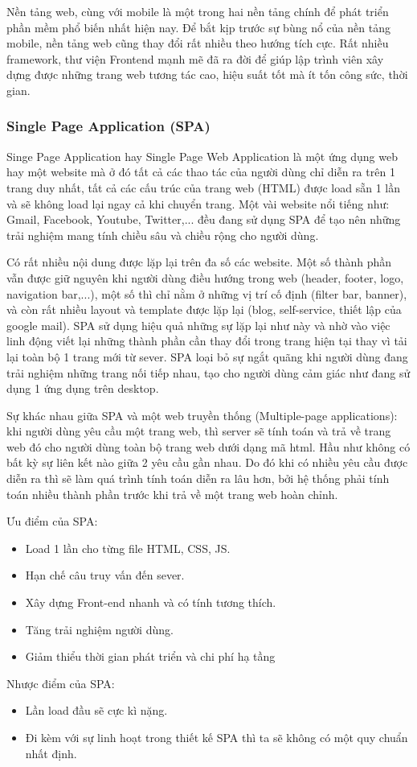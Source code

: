 Nền tảng web, cùng với mobile là một trong hai nền tảng chính để phát triển phần mềm phổ biến nhất hiện nay. Để bắt kịp trước sự bùng nổ của nền tảng mobile, nền tảng web cũng thay đổi rất nhiều theo hướng tích cực. Rất nhiều framework, thư viện Frontend mạnh mẽ đã ra đời để giúp lập trình viên xây dựng được những trang web tương tác cao, hiệu suất tốt mà ít tốn công sức, thời gian.
\subsubsection{Single Page Application (SPA)}
Singe Page Application hay Single Page Web Application là một ứng dụng web hay một website mà ở đó tất cả các thao tác của người dùng chỉ diễn ra trên 1 trang duy nhất, tất cả các cấu trúc của trang web (HTML) được load sẵn 1 lần và sẽ không load lại ngay cả khi chuyển trang. Một vài website nổi tiếng như: Gmail, Facebook, Youtube, Twitter,... đều đang sử dụng SPA để tạo nên những trải nghiệm mang tính chiều sâu và chiều rộng cho người dùng.\par
Có rất nhiều nội dung được lặp lại trên đa số các website. Một số thành phần vẫn được giữ nguyên khi người dùng điều hướng trong web (header, footer, logo, navigation bar,...), một số thì chỉ nằm ở những vị trí cố định (filter bar, banner), và còn rất nhiều layout và template được lặp lại (blog, self-service, thiết lập của google mail). SPA sử dụng hiệu quả những sự lặp lại như này và nhờ vào việc linh động viết lại những thành phần cần thay đổi trong trang hiện tại thay vì tải lại toàn bộ 1 trang mới từ sever. SPA loại bỏ sự ngắt quãng khi người dùng đang trải nghiệm những trang nối tiếp nhau, tạo cho người dùng cảm giác như đang sử dụng 1 ứng dụng trên desktop.\par
Sự khác nhau giữa SPA và một web truyền thống (Multiple-page applications): khi người dùng yêu cầu một trang web, thì server sẽ tính toán và trả về trang web đó cho người dùng toàn bộ trang web dưới dạng mã html. Hầu như không có bất kỳ sự liên kết nào giữa 2 yêu cầu gần nhau. Do đó khi có nhiều yêu cầu được diễn ra thì sẽ làm quá trình tính toán diễn ra lâu hơn, bởi hệ thống phải tính toán nhiều thành phần trước khi trả về một trang web hoàn chỉnh. \par
Ưu điểm của SPA:
\begin{itemize}
    \item Load 1 lần cho từng file HTML, CSS, JS.
    \item Hạn chế câu truy vấn đến sever.
    \item Xây dựng Front-end nhanh và có tính tương thích.
    \item Tăng trải nghiệm người dùng.
    \item Giảm thiểu thời gian phát triển và chi phí hạ tầng
\end{itemize}
Nhược điểm của SPA:
\begin{itemize}
    \item Lần load đầu sẽ cực kì nặng.
    \item Đi kèm với sự linh hoạt trong thiết kế SPA thì ta sẽ không có một quy chuẩn nhất định.
\end{itemize}
